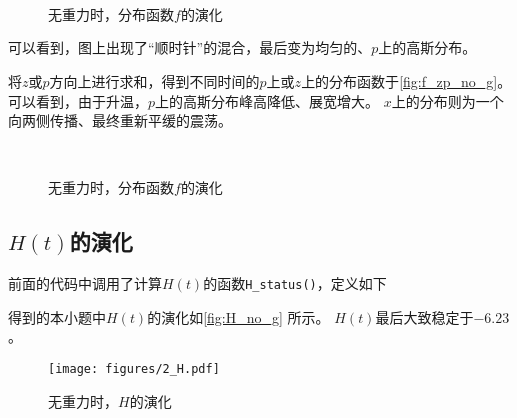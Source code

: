 \documentclass[a4paper,unicode]{report}
\begin{document}
\begin{figure}
    \centering
    \\
    \\
    \\
    \caption{无重力时，分布函数$f$的演化}
    \label{fig:f_no_g}
\end{figure}

可以看到，图上出现了“顺时针”的混合，最后变为均匀的、$p$上的高斯分布。

将$z$或$p$方向上进行求和，得到不同时间的$p$上或$z$上的分布函数于\autoref{fig:f_zp_no_g}。
可以看到，由于升温，$p$上的高斯分布峰高降低、展宽增大。
$x$上的分布则为一个向两侧传播、最终重新平缓的震荡。

\begin{figure}
    \centering
    \\
    \caption{无重力时，分布函数$f$的演化}
    \label{fig:f_zp_no_g}
\end{figure}

\subsection{\texorpdfstring{$H(t)$}{H(t)}的演化}
前面的代码中调用了计算$H(t)$的函数\verb|H_status()|，定义如下
{
    \linespread{1.0}
    
}

得到的本小题中$H(t)$的演化如\autoref{fig:H_no_g} 所示。
$H(t)$最后大致稳定于$-6.23$。

\begin{figure}
    \centering
    \texttt{[image: figures/2\_H.pdf]}
    \caption{无重力时，$H$的演化}
    \label{fig:H_no_g}
\end{figure}
\end{document}
